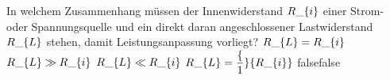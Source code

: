     {In welchem Zusammenhang müssen der Innenwiderstand $R\_\textrm\{i\}$ einer Strom- oder Spannungsquelle und ein direkt daran angeschlossener Lastwiderstand $R\_\textrm\{L\}$ stehen, damit Leistungsanpassung vorliegt?}
    {$R\_\textrm\{L\} = R\_\textrm\{i\}$}
    {$R\_\textrm\{L\} \gg R\_\textrm\{i\}$}
    {$R\_\textrm\{L\} \ll R\_\textrm\{i\}$}
    {$R\_\textrm\{L\} = \dfrac\{1\}\{R\_\textrm\{i\}\}$}
    {false}{false}